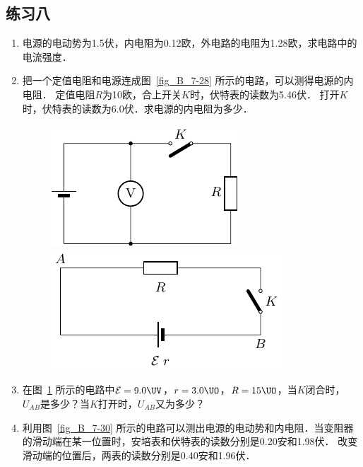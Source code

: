 \subsection*{练习八}
\begin{enumerate}
    \item 电源的电动势为1.5伏，内电阻为0.12欧，外电路的电阻为1.28欧，求电路中的电流强度．
    \item 把一个定值电阻和电源连成图~\ref{fig_B_7-28} 所示的电路，可以测得电源的内电阻．
    定值电阻$R$为10欧，合上开关$K$时，伏特表的读数为5.46伏．
    打开$K$时，伏特表的读数为6.0伏．求电源的内电阻为多少．
    \begin{figure}[htbp]
        \centering
        \begin{minipage}[t]{0.48\textwidth}
            \centering
            \includegraphics{fig/B/7-28.pdf}
            \caption{}\label{fig_B_7-28}
        \end{minipage}
        \begin{minipage}[t]{0.48\textwidth}
            \centering
            \includegraphics{fig/B/7-29.pdf}
            \caption{}\label{fig_B_7-29}
        \end{minipage}
    \end{figure}
    \item 在图~\ref{fig_B_7-29} 所示的电路中$\mathcal{E}=9.0 \UV$，$r=3.0 \UO$，$R=15 \UO$，当$K$闭合时，$U_{AB}$是多少？当$K$打开时，$U_{AB}$又为多少？
    \item 利用图~\ref{fig_B_7-30} 所示的电路可以测出电源的电动势和内电阻．当变阻器的滑动端在某一位置时，安培表和伏特表的读数分别是0.20安和1.98伏．
    改变滑动端的位置后，两表的读数分别是0.40安和1.96伏．

\end{enumerate}
